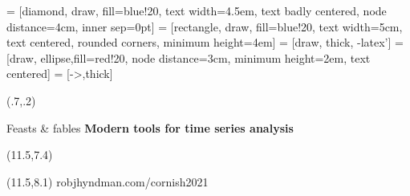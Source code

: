 
\usepackage{bm,booktabs,animate,ragged2e,multicol,microtype,hyperref,alltt}

\fontsize{13}{15}\sf
\usepackage[scale=0.85]{sourcecodepro}
\usepackage{fontawesome}

\usetikzlibrary{trees,shapes,arrows,matrix}
 = [diamond, draw, fill=blue!20,
    text width=4.5em, text badly centered, node distance=4cm, inner sep=0pt]
 = [rectangle, draw, fill=blue!20,
    text width=5cm, text centered, rounded corners, minimum height=4em]
 = [draw, thick, -latex']
 = [draw, ellipse,fill=red!20, node distance=3cm,
    minimum height=2em, text centered]
 = [->,thick]

\graphicspath{{figs/}}

{
\begin{textblock}{12.5}(.7,.2)\fontsize{18}{20}\sf
{\color{MonashBlue}\raggedright{}\par Feasts \& fables \newline\fontsize{18}{20}\sf\bfseries Modern tools for time series analysis}
\end{textblock}
\begin{textblock}{7.5}(11.5,7.4)
{\fontsize{15}{15}\sf\color[RGB]{45,27,15}\bfseries\raggedright{\insertauthor}}
\end{textblock}
\begin{textblock}{7.5}(11.5,8.1)
{\fontsize{9}{9}\sf\color[RGB]{45,27,15}robjhyndman.com/cornish2021}
\end{textblock}
}

\def\E{\text{E}}
\def\V{\text{Var}}
\def\bY{\bm{y}}
\def\by{\bm{y}}
\def\bS{\bm{S}}
\def\bG{\bm{G}}
\def\bW{\bm{W}}
\def\bSigma{\bm{\Sigma}}
\def\Var{\text{Var}}
\def\var{\text{Var}}
\newcommand{\btwocol}{\begin{multicols}{2}}
\newcommand{\etwocol}{\end{multicols}}
\def\pred#1#2#3{\hat{#1}_{#2|#3}}
\def\damped{$_\text{d}$}

\def\forecast{\begin{alertblock}{}\fontsize{10}{11}\sf
A forecast is an estimate of the probability distribution of a variable to be observed in the future.
\end{alertblock}}
\def\simfutures{\begin{textblock}{2.7}(13,7.7)
\begin{block}{}\fontsize{10}{11}\sf
Simulated futures from an ETS model
\end{block}\end{textblock}}
